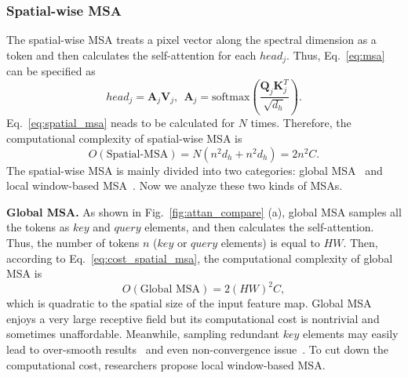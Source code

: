 \documentclass[10pt,twocolumn,letterpaper]{article}
\begin{document}
\begin{table}[t]
	\begin{center}
		
		\setlength{\tabcolsep}{2.5pt}
\caption{\small Comparisons of the properties of  different MSAs. }
		\label{tab:msa_compare}
	\end{center}\vspace{-5mm}
\end{table}

\subsubsection{Spatial-wise MSA}
The spatial-wise MSA treats a pixel vector along the spectral dimension as a token and then calculates the self-attention for each $head_j$. Thus, Eq.~\eqref{eq:msa} can be specified as
\begin{equation}
head_j = \mathbf{A}_j \mathbf{V}_j, ~~\mathbf{A}_j = \text{softmax}(\frac{\mathbf{Q}_j\mathbf{K}_j^T}{\sqrt{d_h}}).
\label{eq:spatial_msa}
\end{equation}
Eq.~\eqref{eq:spatial_msa} neads to be calculated for $N$ times. Therefore, the computational complexity of spatial-wise MSA is
\begin{equation}
O(\text{Spatial-MSA}) = N (n^2 d_h + n^2 d_h) = 2n^2 C.
\label{eq:cost_spatial_msa}
\end{equation}
The spatial-wise MSA is mainly divided into two categories: global MSA~\cite{global_msa} and local window-based MSA~\cite{liu2021swin}. Now we analyze these two kinds of MSAs.

\noindent\textbf{Global MSA.} As shown in Fig.~\ref{fig:attan_compare} (a), global MSA samples all the tokens as $key$ and $query$ elements, and then calculates the self-attention. Thus, the number of tokens $n$ ($key$ or $query$ elements) is equal to $HW$. Then, according to Eq.~\eqref{eq:cost_spatial_msa}, the computational complexity of global MSA is
\begin{equation}
O(\text{Global MSA}) = 2(HW)^2 C,
\label{eq:global_msa}
\end{equation}
which is quadratic to the spatial size of the input feature map. Global MSA enjoys a very large receptive field but its computational cost is nontrivial and sometimes unaffordable. Meanwhile, sampling redundant $key$ elements may easily lead to over-smooth results~\cite{xiangtl_gald} and even non-convergence issue~\cite{de_detr}. To cut down the computational cost, researchers propose local window-based MSA.
\end{document}
